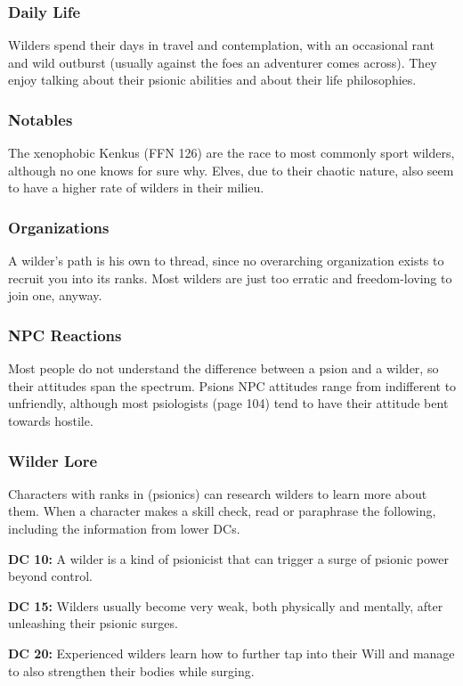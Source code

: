 \subsubsection{Daily Life}

Wilders spend their days in travel and contemplation, with an occasional rant and wild outburst (usually against the foes an adventurer comes across). They enjoy talking about their psionic abilities and about their life philosophies.

\subsubsection{Notables}

The xenophobic Kenkus (FFN 126) are the race to most commonly sport wilders, although no one knows for sure why. Elves, due to their chaotic nature, also seem to have a higher rate of wilders in their milieu.

\subsubsection{Organizations}

A wilder's path is his own to thread, since no overarching organization exists to recruit you into its ranks. Most wilders are just too erratic and freedom-loving to join one, anyway.

\subsubsection{NPC Reactions}

Most people do not understand the difference between a psion and a wilder, so their attitudes span the spectrum. Psions NPC attitudes range from indifferent to unfriendly, although most psiologists (page 104) tend to have their attitude bent towards hostile.

\subsubsection{Wilder Lore}

Characters with ranks in  (psionics) can research wilders to learn more about them. When a character makes a skill check, read or paraphrase the following, including the information from lower DCs.

\textbf{DC 10:} A wilder is a kind of psionicist that can trigger a surge of psionic power beyond control.

\textbf{DC 15:} Wilders usually become very weak, both physically and mentally, after unleashing their psionic surges.

\textbf{DC 20:} Experienced wilders learn how to further tap into their Will and manage to also strengthen their bodies while surging.